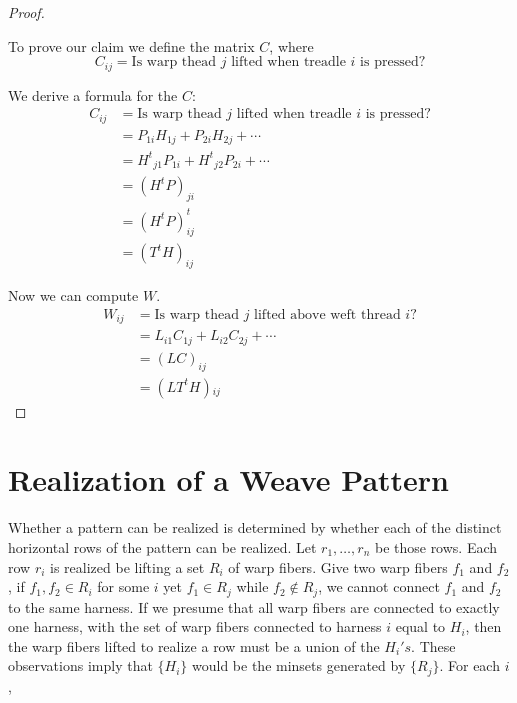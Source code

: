 \documentclass[10pt,]{article}
\theoremstyle{plain}
\begin{document}
\begin{proof}\hypertarget{proof-1}{}
To prove our claim we define the matrix  \(C\),  where \begin{equation*}C_{i j}= \textrm{Is warp thead } j \textrm{ lifted when treadle } i \textrm{ is pressed?}\end{equation*}%
\par
We derive a formula for the \(C\):
\begin{equation*}
\begin{split}
C_{i j} &= \textrm{Is warp thead } j \textrm{ lifted when treadle } i \textrm{ is pressed?}\\
	  	& = P_{1i}H_{1j }+P_{2i}H_{2j }+\cdots \\
		& = H^t{}_{j 1}P_{1 i}+H^t{}_{j 2}P_{2 i} +\cdots \\
		& = \left( H^t P \right)_{j i}\\
		& = \left( H^t P \right)^t_{i j}\\
		& = \left(T^tH\right)_{i j}
\end{split}
\end{equation*}
%
\par
Now we can compute \(W\).
\begin{equation*}
\begin{split}
W_{i j} &= \textrm{Is warp thead } j \textrm{ lifted above weft thread } i?\\
		&= L_{i 1}C_{1j }+ L_{i 2}C_{2j }+\cdots \\
		& = (L C)_{i j}\\
		&= \left(L T^tH\right){}_{i j}
\end{split}
\end{equation*}
%
\end{proof}
\typeout{************************************************}
\typeout{************************************************}
\section[Realization of a Weave Pattern]{Realization of a Weave Pattern}\label{section-realization}
Whether a pattern can be realized is determined by whether each of the distinct horizontal rows of the pattern can be realized. Let \(r_1,\dots , r_n\) be those rows. Each row \(r_i\) is realized be lifting a set \(R_i\) of warp fibers. Give two warp fibers \(f_1\) and \(f_2\), if \(f_1, f_2 \in R_i\) for some \(i\) yet \(f_1 \in R_j\) while \(f_2 \notin R_j\), we cannot connect \(f_1\) and \(f_2\) to the same harness.   If we presume that all warp fibers are connected to exactly one harness, with the set of warp fibers connected to harness \(i\) equal to \(H_i\), then the warp fibers lifted to realize a row must be a union of the \(H_i's\). These observations imply that \(\{H_i\}\) would be the minsets generated by \(\{R_j\}\).  For each \(i\),
\end{document}
